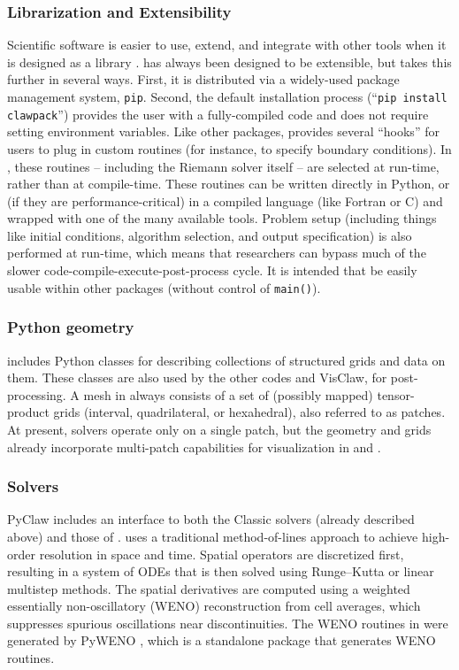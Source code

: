 \subsubsection{Librarization and Extensibility}
Scientific software is easier to use, extend, and integrate with other tools
when it is designed as a library \cite{Brown:2015cj}.  \clawpack has always been
designed to be extensible, but \pyclaw takes this further in several ways.
First, it is distributed via a widely-used package management system,
\texttt{pip}. Second, the default installation process (``\texttt{pip install
clawpack}'') provides the user with a fully-compiled code and does not require
setting environment variables.  Like other \clawpack packages, \pyclaw provides
several ``hooks'' for users to plug in custom routines (for instance, to specify
boundary conditions). In \pyclaw, these routines -- including the Riemann solver
itself -- are selected at run-time, rather than at compile-time.  These routines
can be written directly in Python, or (if they are performance-critical) in a
compiled language (like Fortran or C) and wrapped with one of the many available
tools.  Problem setup (including things like initial conditions, algorithm
selection, and output specification) is also performed at run-time, which means
that researchers can bypass much of the slower code-compile-execute-post-process
cycle. It is intended that \pyclaw be easily usable within other packages
(without control of \texttt{main()}).

\subsubsection{Python geometry}
\pyclaw includes Python classes for describing collections of structured grids
and data on them. These classes are also used by the other codes and
VisClaw, for post-processing.  A mesh in \clawpack always consists of a set of
(possibly mapped) tensor-product
grids (interval, quadrilateral, or hexahedral), also referred to as patches.
At present, \pyclaw solvers operate only on a single patch, but the
geometry and grids already incorporate multi-patch
capabilities for visualization in \amrclaw and \geoclaw.

\subsubsection{\pyclaw Solvers}

PyClaw includes an interface to both the Classic solvers (already
described above) and those of \sharpclaw \cite{ketcheson2012pyclaw}.
\sharpclaw uses a traditional method-of-lines approach to achieve
high-order resolution in space and time.  Spatial operators are
discretized first, resulting in a system of ODEs that is then solved
using Runge--Kutta or linear multistep methods.  The spatial
derivatives are computed using a weighted essentially non-oscillatory
(WENO) reconstruction from cell averages, which suppresses spurious
oscillations near discontinuities.  The WENO routines in \sharpclaw
were generated by PyWENO \cite{pyweno}, which is a standalone package
that generates WENO routines.

